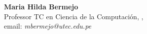 \noindent \textbf{Maria Hilda Bermejo}\\ 
Professor TC en Ciencia de la Computación, \University, \city\\
email: \textit{mbermejo@utec.edu.pe}\\


